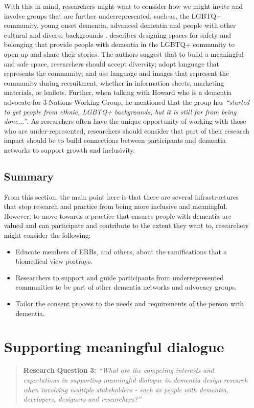 With this in mind, researchers might want to consider how we might invite and involve groups that are further underrepresented, such as, the LGBTQ+ community, young onset dementia, advanced dementia and people with other cultural and diverse backgrounds \citep{foley_struggle_2019, bryden_before_2015}. \cite{mcgovern2014forgotten} describes designing spaces for safety and belonging that provide people with dementia in the LGBTQ+ community to open up and share their stories. The authors suggest that to build a meaningful and safe space, researchers should accept diversity; adopt language that represents the community; and use language and images that represent the community during recruitment, whether in information sheets, marketing materials, or leaflets. Further, when talking with Howard who is a dementia advocate for 3 Nations Working Group, he mentioned that the group has \textit{``started to get people from ethnic, LGBTQ+ backgrounds, but it is still far from being done...''}. As researchers often have the unique opportunity of working with those who are under-represented, researchers should consider that part of their research impact should be to build connections between participants and dementia networks to support growth and inclusivity.

\subsection{Summary}
\label{EthicsSummary}
From this section, the main point here is that there are several infrastructures that stop research and practice from being more inclusive and meaningful. However, to move towards a practice that ensures people with dementia are valued and can participate and contribute to the extent they want to, researchers might consider the following:
\begin{itemize}
    \item Educate members of ERBs, and others, about the ramifications that a biomedical view portrays.
    \item Researchers to support and guide participants from underrepresented communities to be part of other dementia networks and advocacy groups.
    \item Tailor the consent process to the needs and requirements of the person with dementia.
\end{itemize}

\section{Supporting meaningful dialogue}
\label{Discussion:RQ3}
\begin{quote}
\textbf{    Research Question 3:
}    
\textit{ “What are the competing interests and expectations in supporting meaningful dialogue in dementia design research when involving multiple stakeholders - such as people with dementia, developers, designers and researchers?”}
\end{quote}

